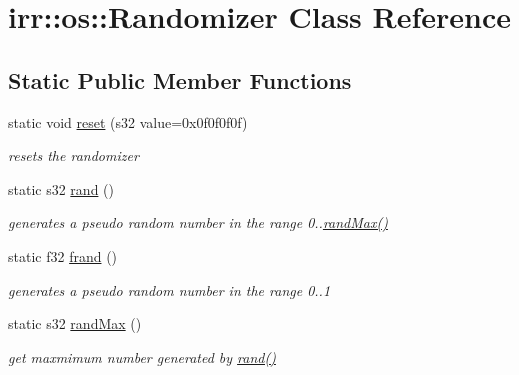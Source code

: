 \hypertarget{classirr_1_1os_1_1_randomizer}{\section{irr\-:\-:os\-:\-:Randomizer Class Reference}
\label{classirr_1_1os_1_1_randomizer}
}
\subsection*{Static Public Member Functions}
\begin{DoxyCompactItemize}
\item 
\hypertarget{classirr_1_1os_1_1_randomizer_aeb3700df8059cc7b94cbe7d6013a0d02}{static void \hyperlink{classirr_1_1os_1_1_randomizer_aeb3700df8059cc7b94cbe7d6013a0d02}{reset} (s32 value=0x0f0f0f0f)}\label{classirr_1_1os_1_1_randomizer_aeb3700df8059cc7b94cbe7d6013a0d02}

\begin{DoxyCompactList}\small\item\em resets the randomizer \end{DoxyCompactList}\item 
static s32 \hyperlink{classirr_1_1os_1_1_randomizer_a46f0fc6837cce6f7e0a74ab2e5119767}{rand} ()
\begin{DoxyCompactList}\small\item\em generates a pseudo random number in the range 0..\hyperlink{classirr_1_1os_1_1_randomizer_a182bbe401ac9b891eb4a5121418aa598}{rand\-Max()} \end{DoxyCompactList}\item 
static f32 \hyperlink{classirr_1_1os_1_1_randomizer_a72c9ec2f765700c051f31561a1e2c1d6}{frand} ()
\begin{DoxyCompactList}\small\item\em generates a pseudo random number in the range 0..1 \end{DoxyCompactList}\item 
\hypertarget{classirr_1_1os_1_1_randomizer_a182bbe401ac9b891eb4a5121418aa598}{static s32 \hyperlink{classirr_1_1os_1_1_randomizer_a182bbe401ac9b891eb4a5121418aa598}{rand\-Max} ()}\label{classirr_1_1os_1_1_randomizer_a182bbe401ac9b891eb4a5121418aa598}

\begin{DoxyCompactList}\small\item\em get maxmimum number generated by \hyperlink{classirr_1_1os_1_1_randomizer_a46f0fc6837cce6f7e0a74ab2e5119767}{rand()} \end{DoxyCompactList}\end{DoxyCompactItemize}


